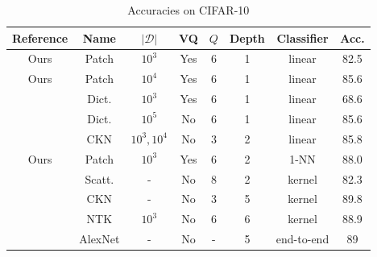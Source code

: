 \documentclass{article}
\begin{document}
{\begin{table}[h]
  \caption{Accuracies on CIFAR-10}
  \label{accuracy}
  \centering
  \begin{tabular}{|c|c|c|c|c|c|c|c|}
    \hline 
    Reference&Name&$|\mathcal{D}|$&VQ&$Q$&Depth &Classifier& Acc. \\
    \hline 
    \hline 
    Ours&Patch&$10^3$ & Yes&6&1&linear&82.5 \\
    \hdashline[0.5pt/1pt]
    Ours&Patch&$10^4$ & Yes&6&1&linear&85.6\\
    \hdashline[0.5pt/1pt]
    \cite{coates2011analysis}&Dict.&$10^3$& Yes&6 & 1&linear & 68.6\\
    \hline 
    \cite{recht2019imagenet}&Dict.&$10^5$ & No& 6&1&linear &85.6\\
    \hdashline[0.5pt/1pt]
    \cite{mairal2016end}&CKN&$10^3, 10^4$& No&3 & 2& linear &85.8\\
    \hline
    Ours&Patch&$10^3$ & Yes& 6&2&1-NN&88.0\\
    \hdashline[0.5pt/1pt]
     \cite{Oyallon_2015_CVPR}&Scatt.& - & No& 8 &2 & kernel & 82.3\\
    \hdashline[0.5pt/1pt]
    \cite{shankar2020neural}&CKN&-& No&3&5&kernel &89.8\\
    \hdashline[0.5pt/1pt]
    \cite{li2019enhanced}&NTK&$10^3$& No&6&6&kernel &88.9\\
    \hdashline[0.5pt/1pt]
    \cite{krizhevsky2012imagenet}&AlexNet&-& No&-&5&end-to-end&89\\
    \hline
  \end{tabular}
\end{table}




}
\end{document}
